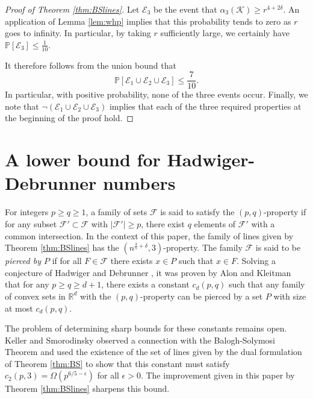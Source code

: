 \documentclass[11pt]{amsart}
\newcommand{\cK}{\mathcal{K}}
\newcommand{\cF}{\mathcal{F}}
\newcommand{\cE}{\mathcal{E}}
\theoremstyle{remark}
\begin{document}
\begin{proof}[Proof of Theorem \ref{thm:BSlines}]
 Let $\mathcal E_3$ be the event that $\alpha_3(\cK) \geq r^{4+2\delta}$. An application of Lemma \ref{lem:whp} implies that this probability tends to zero as $r$ goes to infinity. In particular, by taking $r$ sufficiently large, we certainly have $\mathbb P[ \mathcal E_3] \leq \frac{1}{10}$.

 It therefore follows from the union bound that 
 \[
 \mathbb P[ \cE_1 \cup \cE_2 \cup \cE_3] \leq \frac{7}{10}.
 \]
 In particular, with positive probability, none of the three events occur. Finally, we note that $\neg ( \mathcal E_1 \cup \mathcal E_2 \cup \mathcal E_3 )$ implies that each of the three required properties at the beginning of the proof hold. %
    
\end{proof}

\section{A lower bound for Hadwiger-Debrunner numbers} \label{sec:HD}

For integers $p \geq q \geq 1$, a family of sets $\cF$ is said to satisfy the $(p,q)$-property if for any subset $\cF' \subset \cF$ with $|\cF'| \geq p$, there exist $q$ elements of $\cF'$ with a common intersection. In the context of this paper, the family of lines given by Theorem \ref{thm:BSlines} has the $(n^{\frac{4}{5}+\delta},3)$-property. The family $\cF$ is said to be \textit{pierced by $P$} if for all $F \in \cF$ there exists $x \in P$ such that $x \in F$. Solving a conjecture of Hadwiger and Debrunner \cite{HaDe}, it was proven by Alon and Kleitman \cite{AlKl} that for any $p \geq q \geq d+1$, there exists a constant $c_d(p,q)$ such that any family of convex sets in $\mathbb R^d$ with the $(p,q)$-property can be pierced by a set $P$ with size at most $c_d(p,q)$.

The problem of determining sharp bounds for these constants remains open. Keller and Smorodinsky \cite{KeSm} observed a connection with the Balogh-Solymosi Theorem and used the existence of the set of lines given by the dual formulation of Theorem \ref{thm:BS} to show that this constant must satisfy $c_2(p,3) =\Omega(p^{6/5-\epsilon})$ for all $\epsilon >0$. The improvement given in this paper by Theorem \ref{thm:BSlines} sharpens this bound.
\end{document}
